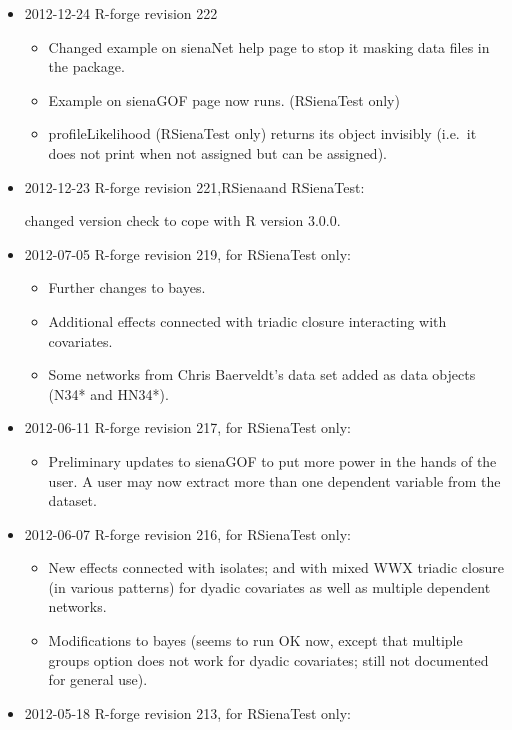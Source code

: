 \documentclass[a4paper,fleqn,11pt]{article}
\newcommand{\+}{\, + \,}
\newcommand{\sfn}[1]{\textsf{#1}}
\begin{document}
\begin{small}
\begin{itemize}
\item 2012-12-24 R-forge revision 222
\begin{itemize}
\item Changed example on \sfn{sienaNet} help page to stop it masking data files
  in the package.
\item Example on \textsf{sienaGOF} page now runs. (RSienaTest only)
\item \sfn{profileLikelihood} (RSienaTest only) returns its object invisibly
  (i.e.\  it does not print when not assigned but can be assigned).
\end{itemize}
\item 2012-12-23 R-forge revision 221,\textsf{RSiena}and \textsf{RSienaTest}:

  changed version check to cope with R version 3.0.0.
\item 2012-07-05 R-forge revision 219, for \textsf{RSienaTest} only:
\begin{itemize}
  \item Further changes to bayes.
  \item Additional effects connected with triadic closure interacting with
    covariates.
  \item Some networks from Chris Baerveldt's data set added
        as data objects (N34* and HN34*).
\end{itemize}
\item 2012-06-11 R-forge revision 217, for \textsf{RSienaTest} only:
\begin{itemize}
  \item Preliminary updates to sienaGOF to put more power in the hands of the
  user.
  A user may now extract more than one dependent variable from the dataset.
\end{itemize}
\item 2012-06-07 R-forge revision 216, for \textsf{RSienaTest} only:
\begin{itemize}
  \item New effects connected with isolates; and with mixed WWX triadic closure
      (in various patterns) for dyadic covariates as well as multiple
      dependent networks.
  \item Modifications to bayes (seems to run OK now, except that multiple
      groups option does not work for dyadic covariates;
      still not documented for general use).
\end{itemize}
\item 2012-05-18 R-forge revision 213, for \textsf{RSienaTest} only:
    \begin{itemize}

\end{itemize}
\end{itemize}
\end{small}
\end{document}
